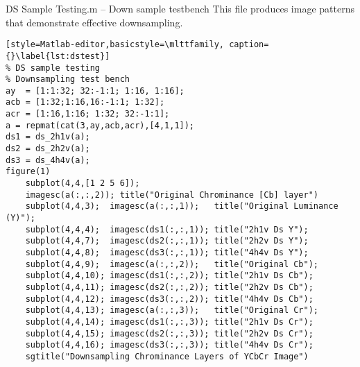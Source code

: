 \begin{codeblock}{DS Sample Testing.m -- Down sample testbench}
This file produces image patterns that demonstrate effective downsampling.
        
\begin{lstlisting}[style=Matlab-editor,basicstyle=\mlttfamily, caption={}\label{lst:dstest}]
% DS sample testing
% Downsampling test bench
ay  = [1:1:32; 32:-1:1; 1:16, 1:16];
acb = [1:32;1:16,16:-1:1; 1:32];
acr = [1:16,1:16; 1:32; 32:-1:1];
a = repmat(cat(3,ay,acb,acr),[4,1,1]);
ds1 = ds_2h1v(a);
ds2 = ds_2h2v(a);
ds3 = ds_4h4v(a);
figure(1)
    subplot(4,4,[1 2 5 6]);
    imagesc(a(:,:,2)); title("Original Chrominance [Cb] layer")
    subplot(4,4,3);  imagesc(a(:,:,1));   title("Original Luminance (Y)");
    subplot(4,4,4);  imagesc(ds1(:,:,1)); title("2h1v Ds Y");
    subplot(4,4,7);  imagesc(ds2(:,:,1)); title("2h2v Ds Y");
    subplot(4,4,8);  imagesc(ds3(:,:,1)); title("4h4v Ds Y");
    subplot(4,4,9);  imagesc(a(:,:,2));   title("Original Cb");
    subplot(4,4,10); imagesc(ds1(:,:,2)); title("2h1v Ds Cb");
    subplot(4,4,11); imagesc(ds2(:,:,2)); title("2h2v Ds Cb");
    subplot(4,4,12); imagesc(ds3(:,:,2)); title("4h4v Ds Cb");
    subplot(4,4,13); imagesc(a(:,:,3));   title("Original Cr");
    subplot(4,4,14); imagesc(ds1(:,:,3)); title("2h1v Ds Cr");
    subplot(4,4,15); imagesc(ds2(:,:,3)); title("2h2v Ds Cr");
    subplot(4,4,16); imagesc(ds3(:,:,3)); title("4h4v Ds Cr");
    sgtitle("Downsampling Chrominance Layers of YCbCr Image")
    \end{lstlisting}
\end{codeblock}
\clearpage


